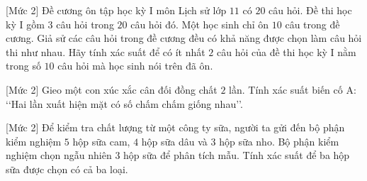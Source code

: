 \begin{bt}%
[Mức 2]%
	Đề cương ôn tập học kỳ I môn Lịch sử lớp $ 11 $ có $ 20 $ câu hỏi. Đề thi học kỳ I gồm $ 3 $ câu hỏi trong $ 20 $ câu hỏi đó. Một học sinh chỉ ôn $ 10 $ câu trong đề cương. Giả sử các câu hỏi trong đề cương đều có khả năng được chọn làm câu hỏi thi như nhau. Hãy tính xác suất để có ít nhất $ 2 $ câu hỏi của đề thi học kỳ I nằm trong số $ 10 $ câu hỏi mà học sinh nói trên đã ôn.	
\end{bt}

\begin{bt}%
[Mức 2]
	Gieo một con xúc xắc cân đối đồng chất $ 2 $ lần. Tính xác suất biến cố A: \lq\lq Hai lần xuất hiện mặt có số chấm chấm giống nhau\rq\rq.
\end{bt}

\begin{bt}%
[Mức 2]
	Để kiểm tra chất lượng từ một công ty sữa, người ta gửi đến bộ phận kiểm nghiệm $5$ hộp sữa cam, $4$ hộp sữa dâu và $3$ hộp sữa nho. Bộ phận kiểm nghiệm chọn ngẫu nhiên $3$ hộp sữa để phân tích mẫu. Tính xác suất để ba hộp sữa được chọn có cả ba loại.
\end{bt}

